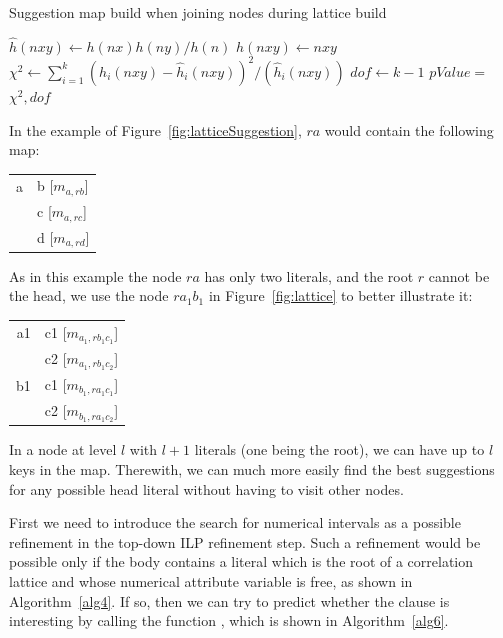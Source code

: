\begin{algorithm}[h!]
 \caption{Suggestion map build when joining nodes during lattice build}
  $\hat{h}(nxy) \leftarrow h(nx)h(ny)/h(n)$\;
  $h(nxy) \leftarrow $$nxy$\FuncSty{)}\;
  $\chi^2 \leftarrow \sum_{i=1}^{k}(h_i(nxy)-\hat{h}_i(nxy))^2/(\hat{h}_i(nxy))$\;
  $dof \leftarrow k-1$\;
  $pValue = $$\chi^2,dof$\FuncSty{)}\;
 \label{alg:buildmaps}
\end{algorithm}

In the example of Figure~\ref{fig:latticeSuggestion}, $ra$ would contain the following map:

\begin{center}
  \begin{tabular}{r | l}
    a & b [$m_{a,rb}$] \\
      & c [$m_{a,rc}$] \\
      & d [$m_{a,rd}$]
  \end{tabular}
\end{center}

As in this example the node $ra$ has only two literals, and the root $r$ cannot be the head, we use the node $ra_1b_1$
in Figure~\ref{fig:lattice} to better illustrate it:

\begin{center}
  \begin{tabular}{r | l}
    a1 	& c1 [$m_{a_1,rb_1c_1}$] \\
	& c2 [$m_{a_1,rb_1c_2}$] \\
    \hline
    b1	& c1 [$m_{b_1,ra_1c_1}$] \\
	& c2 [$m_{b_1,ra_1c_2}$]
  \end{tabular}
\end{center}

In a node at level $l$ with $l+1$ literals (one being the root), we can have up to $l$ keys in the map. Therewith, we
can much more easily find the best suggestions for any possible head literal without having to visit other nodes.

First we need to introduce the search for numerical intervals as a possible refinement in the top-down ILP refinement
step. Such a refinement would be possible only if the body contains a literal which is the root of a correlation
lattice and whose numerical attribute variable is free, as shown in Algorithm~\ref{alg4}. If so, then we can try to
predict whether the clause is interesting by calling the function , which is shown in
Algorithm~\ref{alg6}.


